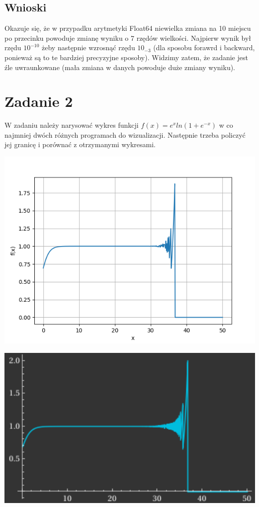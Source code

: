 \documentclass{article}
\begin{document}
\subsection*{Wnioski} Okazuje się, że w przypadku arytmetyki Float64 niewielka zmiana na 10 miejscu po przecinku powoduje zmianę wyniku o 7 rzędów wielkości. Najpierw wynik był rzędu $10^{-10}$ żeby następnie wzrosnąć rzędu $10_{-3}$ (dla sposobu forawrd i backward, ponieważ są to te bardziej precyzyjne sposoby). Widzimy zatem, że zadanie jest źle uwraunkowane (mała zmiana w danych powoduje duże zmiany wyniku).

\section{Zadanie 2}
W zadaniu należy narysować wykres funkcji $f(x) = e^xln(1+e^{-x})$ w co najmniej dwóch różnych programach do wizualizacji. Następnie trzeba policzyć jej granicę i porównać z otrzymanymi wykresami.\\
\noindent
\begin{minipage}{0.48\textwidth}
    \begin{center}
        \includegraphics[width=1\textwidth]{pyplot_fx.png}
    \end{center}
\end{minipage}
\hfill
\begin{minipage}{0.48\textwidth}
    \begin{center}
        \includegraphics[width=1\textwidth]{wolfram_fx.png}
    \end{center}
\end{minipage}
\end{document}
